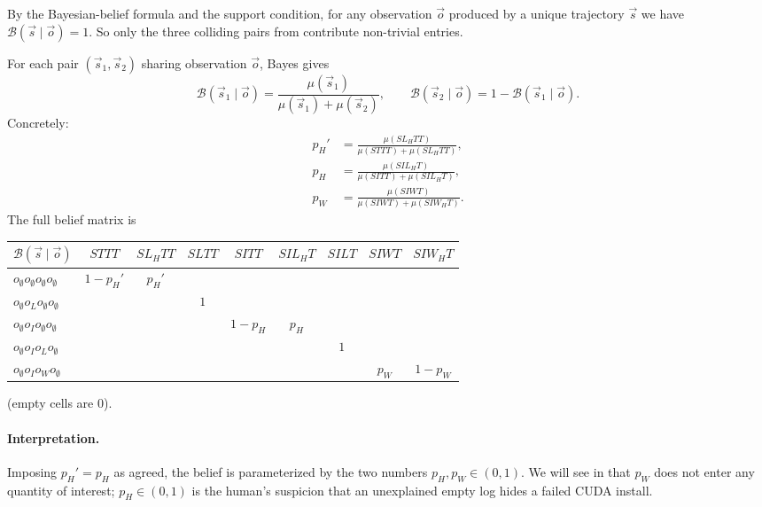 \documentclass[11pt]{article}
\newcommand{\cB}{\mathcal{B}}
\begin{document}
\begin{solution}
By the Bayesian-belief formula and the support condition, for any
observation $\vec o$ produced by a unique trajectory $\vec s$ we have
$\cB(\vec s \mid \vec o) = 1$. So only the three colliding pairs from
 contribute non-trivial entries.

For each pair $(\vec s_1, \vec s_2)$ sharing observation $\vec o$, Bayes
gives
$$
\cB(\vec s_1 \mid \vec o)
= \frac{\mu(\vec s_1)}{\mu(\vec s_1) + \mu(\vec s_2)},
\qquad
\cB(\vec s_2 \mid \vec o) = 1 - \cB(\vec s_1 \mid \vec o).
$$
Concretely:
\begin{align*}
p_H' &= \frac{\mu(SL_HTT)}{\mu(STTT) + \mu(SL_HTT)}, \\
p_H  &= \frac{\mu(SIL_HT)}{\mu(SITT) + \mu(SIL_HT)}, \\
p_W  &= \frac{\mu(SIWT)}{\mu(SIWT) + \mu(SIW_HT)}.
\end{align*}
The full belief matrix is
\begin{center}\small
\begin{tabular}{l|cccccccc}
$\cB(\vec s \mid \vec o)$ & $STTT$ & $SL_HTT$ & $SLTT$ & $SITT$ & $SIL_HT$ & $SILT$ & $SIWT$ & $SIW_HT$ \\\hline
$o_\emptyset o_\emptyset o_\emptyset o_\emptyset$ & $1-p_H'$ & $p_H'$ & & & & & & \\
$o_\emptyset o_L o_\emptyset o_\emptyset$ & & & $1$ & & & & & \\
$o_\emptyset o_I o_\emptyset o_\emptyset$ & & & & $1-p_H$ & $p_H$ & & & \\
$o_\emptyset o_I o_L o_\emptyset$         & & & & & & $1$ & & \\
$o_\emptyset o_I o_W o_\emptyset$         & & & & & & & $p_W$ & $1-p_W$
\end{tabular}
\end{center}
(empty cells are $0$).
\end{solution}

\paragraph{Interpretation.} Imposing $p_H' = p_H$ as agreed, the belief is
parameterized by the two numbers $p_H, p_W \in (0,1)$. We will see in
 that $p_W$ does not enter any quantity of interest;
$p_H \in (0,1)$ is the human's suspicion that an unexplained empty log
hides a failed CUDA install.

\end{document}
